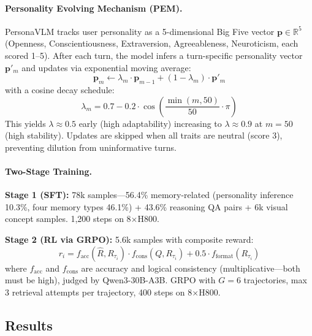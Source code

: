 \documentclass[11pt]{article}
\begin{document}
\paragraph{Personality Evolving Mechanism (PEM).}
PersonaVLM tracks user personality as a 5-dimensional Big Five vector $\mathbf{p} \in \mathbb{R}^5$ (Openness, Conscientiousness, Extraversion, Agreeableness, Neuroticism, each scored 1--5). After each turn, the model infers a turn-specific personality vector $\mathbf{p}'_m$ and updates via exponential moving average:
\begin{equation}
    \mathbf{p}_m \leftarrow \lambda_m \cdot \mathbf{p}_{m-1} + (1 - \lambda_m) \cdot \mathbf{p}'_m
\end{equation}
with a cosine decay schedule:
\begin{equation}
    \lambda_m = 0.7 - 0.2 \cdot \cos\!\left(\frac{\min(m, 50)}{50} \cdot \pi\right)
\end{equation}
This yields $\lambda \approx 0.5$ early (high adaptability) increasing to $\lambda \approx 0.9$ at $m = 50$ (high stability). Updates are skipped when all traits are neutral (score 3), preventing dilution from uninformative turns.

\paragraph{Two-Stage Training.}
\textbf{Stage 1 (SFT):} 78k samples---56.4\% memory-related (personality inference 10.3\%, four memory types 46.1\%) + 43.6\% reasoning QA pairs + 6k visual concept samples. 1,200 steps on 8$\times$H800.

\textbf{Stage 2 (RL via GRPO):} 5.6k samples with composite reward:
\begin{equation}
    r_i = f_{\mathrm{acc}}(\hat{R}, R_{\tau_i}) \cdot f_{\mathrm{cons}}(Q, R_{\tau_i}) + 0.5 \cdot f_{\mathrm{format}}(R_{\tau_i})
\end{equation}
where $f_{\mathrm{acc}}$ and $f_{\mathrm{cons}}$ are accuracy and logical consistency (multiplicative---both must be high), judged by Qwen3-30B-A3B. GRPO with $G = 6$ trajectories, max 3 retrieval attempts per trajectory, 400 steps on 8$\times$H800.

\subsection{Results}
\end{document}
